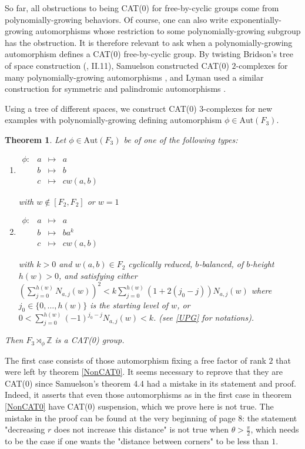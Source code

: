 \documentclass  [a4paper, 11pts] {article}
\newtheorem{thm}{Theorem}[section]
\newcommand{\Z}{\mathbb{Z}}
\newcommand{\Aut}{{\mathrm{Aut}}}
\begin{document}
So far, all obstructions to being CAT(0) for free-by-cyclic groups come from polynomially-growing behaviors. Of course, one can also write exponentially-growing automorphisms whose restriction to some polynomially-growing subgroup has the obstruction. It is therefore relevant to ask when a polynomially-growing automorphism defines a CAT(0) free-by-cyclic group. By twisting Bridson's tree of space construction (\cite{BH99}, II.11), Samuelson constructed CAT(0) $2$-complexes for many polynomially-growing automorphisms \cite{Sam06}, and Lyman used a similar construction for symmetric and palindromic automorphisms \cite{Lym23}.

Using a tree of different spaces, we construct CAT(0) $3$-complexes for new examples with polynomially-growing defining automorphism $\phi\in \Aut(F_3)$.

\begin{thm}
\label{YesCAT0}
    Let $\phi\in \Aut(F_3)$ be of one of the following types:
    \begin{enumerate}
        \item $\begin{array}{rccl} \phi: &
            a & \mapsto & a \\
            & b & \mapsto & b \\
            & c & \mapsto & cw(a,b)
            \end{array}$
            
            with $w\notin [F_2, F_2]$ or $w=1$

        \item $\begin{array}{rccl} \phi: &
            a & \mapsto & a \\
            & b & \mapsto & ba^k \\
            & c & \mapsto & cw(a,b)
            \end{array}$
            
            with $k > 0$ and $w(a,b)\in F_2$ cyclically reduced, $b$-balanced, of $b$-height $h(w) > 0$, and satisfying either $\displaystyle \left(\sum_{j=0}^{h(w)} N_{a,j}(w)\right)^2 < k\sum_{j=0}^{h(w)} (1 + 2(j_0-j))N_{a,j}(w)$ where $j_0\in \{0, \ldots, h(w)\}$ is the starting level of $w$, or $\displaystyle 0 < \sum_{j=0}^{h(w)} (-1)^{j_0-j}N_{a,j}(w) < k$.
 (see \ref{UPG} for notations).
    \end{enumerate}
    Then $F_3\rtimes_\phi \Z$ is a CAT(0) group.
\end{thm}

The first case consists of those automorphism fixing a free factor of rank $2$ that were left by theorem \ref{NonCAT0}. It seems necessary to reprove that they are CAT(0) since Samuelson's theorem 4.4 \cite{Sam06} had a mistake in its statement and proof. Indeed, it asserts that even those automorphisms as in the first case in theorem \ref{NonCAT0} have CAT(0) suspension, which we prove here is not true. The mistake in the proof can be found at the very beginning of page 8: the statement "decreasing $r$ does not increase this distance" is not true when $\theta > \frac{\pi}{2}$, which needs to be the case if one wants the "distance between corners" to be less than $1$.
\end{document}
